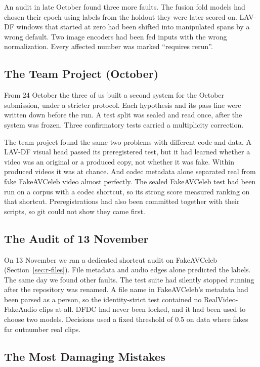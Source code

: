 An audit in late October found three more faults. The fusion fold models had
chosen their epoch using labels from the holdout they were later scored on.
LAV-DF windows that started at zero had been shifted into manipulated spans by
a wrong default. Two image encoders had been fed inputs with the wrong
normalization. Every affected number was marked ``requires rerun''.

\subsection{The Team Project (October)}

From 24 October the three of us built a second system for the October
submission, under a stricter protocol. Each hypothesis and its pass line were
written down before the run. A test split was sealed and read once, after the
system was frozen. Three confirmatory tests carried a multiplicity correction.

The team project found the same two problems with different code and data. A
LAV-DF visual head passed its preregistered test, but it had learned whether a
video was an original or a produced copy, not whether it was fake. Within
produced videos it was at chance. And codec metadata alone separated real from
fake FakeAVCeleb video almost perfectly. The sealed FakeAVCeleb test had been
run on a corpus with a codec shortcut, so its strong score measured ranking on
that shortcut. Preregistrations had also been committed together with their
scripts, so git could not show they came first.

\subsection{The Audit of 13 November}

On 13 November we ran a dedicated shortcut audit on FakeAVCeleb
(Section~\ref{sec:r-files}). File metadata and audio edges alone predicted the
labels. The same day we found other faults. The test suite had silently
stopped running after the repository was renamed. A file name in FakeAVCeleb's
metadata had been parsed as a person, so the identity-strict test contained no
RealVideo-FakeAudio clips at all. DFDC had never been locked, and it had been
used to choose two models. Decisions used a fixed threshold of 0.5 on data
where fakes far outnumber real clips.

\subsection{The Most Damaging Mistakes}

